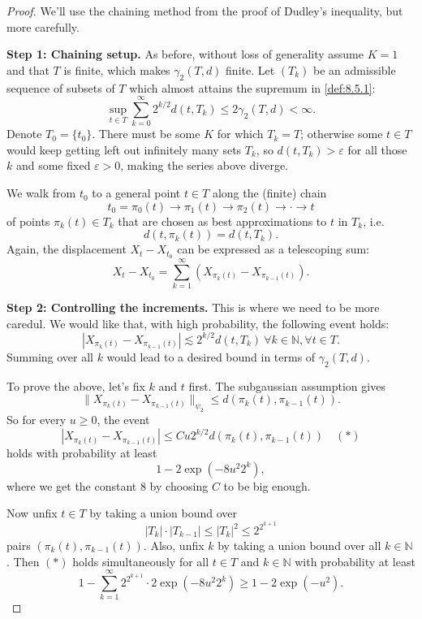 \begin{proof}
We'll use the chaining method from the proof of Dudley's inequality, but more carefully.

\textbf{Step 1: Chaining setup.} As before, without loss of generality assume $K = 1$ and that $T$ is finite, 
which makes $\gamma_2(T, d)$ finite. Let $(T_k)$ be an admissible sequence of subsets of $T$ which almost 
attains the supremum in \cref{def:8.5.1}:
\[ \sup_{t \in T}\sum_{k = 0}^{\infty}2^{k/2}d(t, T_k) \leq 2 \gamma_2(T, d) < \infty. \]
Denote $T_0 = \{ t_0 \}$. There must be some $K$ for which $T_k = T$; otherwise some $t \in T$ would keep 
getting left out infinitely many sets $T_k$, so $d(t, T_k) > \varepsilon$ for all those $k$ and some fixed 
$\varepsilon > 0$, making the series above diverge.

We walk from $t_0$ to a general point $t \in T$ along the (finite) chain 
\[ t_0 = \pi_0(t) \to \pi_1(t) \to \pi_2(t) \to \cdot \to t \]
of points $\pi_k(t) \in T_k$ that are chosen as best approximations to $t$ in $T_k$, i.e.
\[ d(t, \pi_k(t)) = d(t, T_k). \]
Again, the displacement $X_t - X_{t_0}$ can be expressed as a telescoping sum:
\[ X_t - X_{t_0} = \sum_{k = 1}^{\infty}(X_{\pi_k(t)} - X_{\pi_{k - 1}(t)}). \]

\textbf{Step 2: Controlling the increments.} This is where we need to be more caredul. We would like that, with 
high probability, the following event holds:
\[ |X_{\pi_k(t)} - X_{\pi_{k - 1}(t)}| \lesssim 2^{k/2}d(t, T_k) \ \forall k \in \mathbb{N}, \forall t \in T. \]
Summing over all $k$ would lead to a desired bound in terms of $\gamma_2(T, d)$.

To prove the above, let's fix $k$ and $t$ first. The subgaussian assumption gives 
\[ \lVert X_{\pi_k(t)} - X_{\pi_{k - 1}(t)} \rVert_{\psi_2} \leq d(\pi_k(t), \pi_{k - 1}(t)). \]
So for every $u \geq 0$, the event 
\[ |X_{\pi_k(t)} - X_{\pi_{k - 1}(t)}| \leq Cu 2^{k/2} d(\pi_k(t), \pi_{k - 1}(t)) \quad (*) \]
holds with probability at least 
\[ 1 - 2 \exp{(-8u^2 2^k)}, \]
where we get the constant 8 by choosing $C$ to be big enough.

Now unfix $t \in T$ by taking a union bound over 
\[ |T_k| \cdot |T_{k - 1}| \leq |T_k|^2 \leq 2^{2^{k + 1}} \]
pairs $(\pi_k(t), \pi_{k - 1}(t))$. Also, unfix $k$ by taking a union bound over all $k \in \mathbb{N}$. Then 
$(*)$ holds simultaneously for all $t \in T$ and $k \in \mathbb{N}$ with probability at least 
\[ 1 - \sum_{k = 1}^{\infty} 2^{2^{k + 1}} \cdot 2 \exp{(-8u^2 2^k)} \geq 1 - 2 \exp{(-u^2)}. \]


\end{proof}
